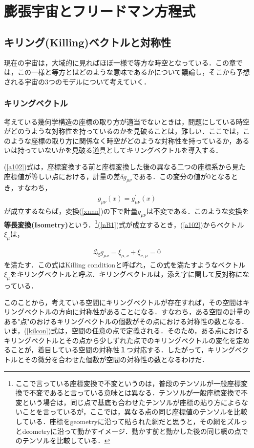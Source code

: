 \chapter{膨張宇宙とフリードマン方程式}
\section{キリング(Killing)ベクトルと対称性}
現在の宇宙は，大域的に見ればほぼ一様で等方な時空となっている．この章では，この一様と等方とはどのような意味であるかについて議論し，そこから予想される宇宙の3つのモデルについて考えていく．
\subsection{キリングベクトル}
考えている幾何学構造の座標の取り方が適当でないときは，問題にしている時空がどのうような対称性を持っているのかを見破ることは，難しい．ここでは，このような座標の取り方に関係なく時空がどのような対称性を持っているか，あるいは持っていないかを見破る道具としてキリングベクトルを導入する．

(\ref{a102})式は，座標変換する前と座標変換した後の異なる二つの座標系から見た座標値が等しい点における，計量の差$\delta g_{\mu\nu}$である．この変分の値が$0$となるとき，すなわち，
\begin{eqnarray}
\label{nB1}
g_{\mu\nu}(x)=g^{\prime}_{\mu\nu}(x)
\end{eqnarray}
が成立するならば，変換(\ref{xnnn})の下で計量$g_{\mu\nu}$は不変である．このような変換を\textbf{等長変換(Isometry)}という．\footnote{ここで言っている座標変換で不変というのは，普段のテンソルが一般座標変換で不変であると言っている意味とは異なる．テンソルが一般座標変換で不変という場合は，同じ点で基底も合わせたテンソルが座標の貼り方によらないことを言っているが，ここでは，異なる点の同じ座標値のテンソルを比較している．座標をgeometryに沿って貼られた網だと思うと，その網をズルっとdeometryに沿って動かすイメージ．動かす前と動かした後の同じ網の点でのテンソルを比較している．}(\ref{nB1})式が成立するとき，(\ref{a102})からベクトル$\xi_{\mu}$は，
\begin{empheqboxed}
\begin{eqnarray}
\label{kilcon}
\mathfrak{L}_{\xi}g_{\mu\nu} =\xi_{\mu;\nu}+\xi_{\nu;\mu}=0
\end{eqnarray}
を満たす．この式はKilling conditionと呼ばれ，この式を満たすようなベクトル$\xi_{\mu}$をキリングベクトルと呼ぶ．キリングベクトルは，添え字に関して反対称になっている．
\end{empheqboxed}
このことから，考えている空間にキリングベクトルが存在すれば，その空間はキリングベクトルの方向に対称性があることになる．すなわち，ある空間の計量のある"点"のおけるキリングベクトルの個数がその点における対称性の数となる．いま，(\ref{kilcon})式は，空間の任意の点で定義される．そのため，ある点におけるキリングベクトルとその点から少しずれた点でのキリングベクトルの変化を定めることが，着目している空間の対称性１つ対応する．したがって，キリングベクトルとその微分を合わせた個数が空間の対称性の数となるわけだ．


